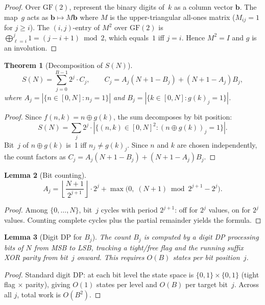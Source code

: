 \documentclass[11pt]{article}
\newtheorem{theorem}{Theorem}
\newtheorem{lemma}[theorem]{Lemma}
\begin{document}
\begin{proof}
Over $\mathrm{GF}(2)$, represent the binary digits of~$k$ as a column vector $\mathbf{b}$. The map~$g$ acts as $\mathbf{b} \mapsto M\mathbf{b}$ where $M$ is the upper-triangular all-ones matrix ($M_{ij} = 1$ for $j \ge i$). The $(i,j)$-entry of $M^2$ over $\mathrm{GF}(2)$ is $\bigoplus_{\ell=i}^{j} 1 = (j - i + 1) \bmod 2$, which equals~$1$ iff $j = i$. Hence $M^2 = I$ and $g$ is an involution.
\end{proof}

\begin{theorem}[Decomposition of $S(N)$]
\label{thm:decomp}
\[
S(N) = \sum_{j=0}^{B-1} 2^j \cdot C_j, \qquad C_j = A_j(N+1-B_j) + (N+1-A_j)B_j,
\]
where $A_j = |\{n \in [0,N] : n_j = 1\}|$ and $B_j = |\{k \in [0,N] : g(k)_j = 1\}|$.
\end{theorem}

\begin{proof}
Since $f(n,k) = n \oplus g(k)$, the sum decomposes by bit position:
\[
S(N) = \sum_{j} 2^j \cdot |\{(n,k) \in [0,N]^2 : (n \oplus g(k))_j = 1\}|.
\]
Bit~$j$ of $n \oplus g(k)$ is~1 iff $n_j \ne g(k)_j$. Since $n$ and $k$ are chosen independently, the count factors as $C_j = A_j(N+1-B_j) + (N+1-A_j)B_j$.
\end{proof}

\begin{lemma}[Bit counting]
\[
A_j = \left\lfloor \frac{N+1}{2^{j+1}} \right\rfloor \cdot 2^j + \max\!\bigl(0,\; (N+1) \bmod 2^{j+1} - 2^j\bigr).
\]
\end{lemma}

\begin{proof}
Among $\{0,\ldots,N\}$, bit~$j$ cycles with period $2^{j+1}$: off for $2^j$ values, on for $2^j$ values. Counting complete cycles plus the partial remainder yields the formula.
\end{proof}

\begin{lemma}[Digit DP for $B_j$]
The count $B_j$ is computed by a digit DP processing bits of $N$ from MSB to LSB, tracking a tight/free flag and the running suffix XOR parity from bit~$j$ onward. This requires $O(B)$ states per bit position~$j$.
\end{lemma}

\begin{proof}
Standard digit DP: at each bit level the state space is $\{0,1\} \times \{0,1\}$ (tight flag $\times$ parity), giving $O(1)$ states per level and $O(B)$ per target bit~$j$. Across all $j$, total work is $O(B^2)$.
\end{proof}
\end{document}
